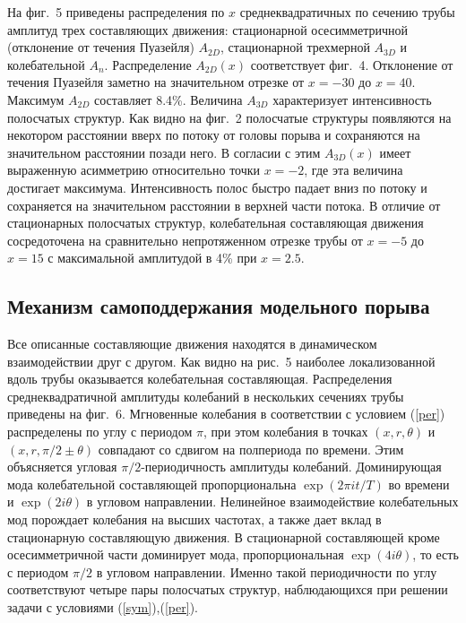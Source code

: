На фиг.~5 приведены распределения по $x$ среднеквадратичных по сечению трубы амплитуд трех составляющих движения: стационарной осесимметричной (отклонение от течения Пуазейля) $A_{2D}$, стационарной трехмерной $A_{3D}$ и колебательной $A_n$. Распределение $A_{2D}(x)$ соответствует фиг.~4. Отклонение от течения Пуазейля заметно на значительном отрезке от $x=-30$ до $x=40$. Максимум $A_{2D}$ составляет  8.4\%. Величина $A_{3D}$ характеризует интенсивность полосчатых структур. Как видно на фиг.~2 полосчатые структуры появляются на некотором расстоянии вверх по потоку от головы порыва и сохраняются на значительном расстоянии позади него. В согласии с этим $A_{3D}(x)$ имеет выраженную асимметрию относительно точки $x=-2$, где эта величина достигает максимума. Интенсивность полос быстро падает вниз по потоку и сохраняется на значительном расстоянии в верхней части потока. В отличие от стационарных полосчатых структур, колебательная составляющая движения сосредоточена на сравнительно непротяженном отрезке трубы от $x=-5$ до $x=15$ с максимальной амплитудой в 4\% при $x=2.5$.

\subsection{Механизм самоподдержания модельного порыва} 

Все описанные составляющие движения находятся в динамическом взаимодействии друг с другом. Как видно на рис.~5 наиболее локализованной вдоль трубы оказывается колебательная составляющая. Распределения среднеквадратичной амплитуды колебаний в нескольких сечениях трубы приведены на фиг.~6. Мгновенные колебания в соответствии с условием (\ref{per}) распределены по углу с периодом $\pi$, при этом колебания в точках $(x,r,\theta)$ и $(x,r,\pi/2\pm\theta)$ совпадают со сдвигом на полпериода по времени. Этим объясняется угловая $\pi/2$-периодичность амплитуды колебаний. Доминирующая мода колебательной составляющей пропорциональна $\exp(2\pi it/T)$ во времени и $\exp(2i\theta)$ в угловом направлении. Нелинейное взаимодействие колебательных мод порождает колебания на высших частотах, а также дает вклад в стационарную составляющую движения. В стационарной составляющей кроме осесимметричной части доминирует мода, пропорциональная $\exp(4i\theta)$, то есть с периодом $\pi/2$ в угловом направлении. Именно такой периодичности по углу соответствуют четыре пары полосчатых структур, наблюдающихся при решении задачи с условиями (\ref{sym}),(\ref{per}).

